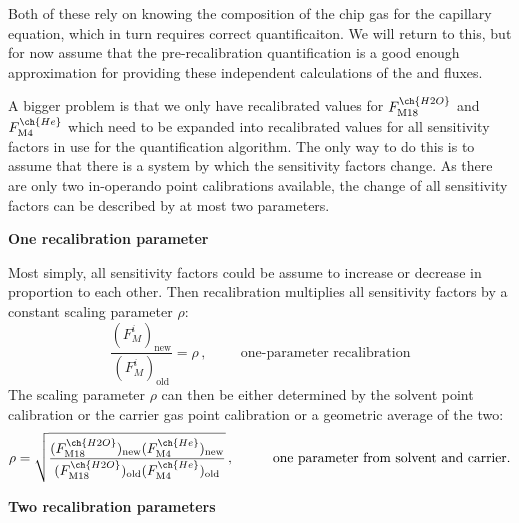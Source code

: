 \documentclass{article}
\begin{document}
Both of these rely on knowing the composition of the chip gas for the capillary equation, which in turn requires correct quantificaiton. We will return to this, but for now assume that the pre-recalibration quantification is a good enough approximation for providing these independent calculations of the  and  fluxes.

A bigger problem is that we only have recalibrated values for $F^{\ch{H2O}}_\text{M18}$ and $F^{\ch{He}}_\text{M4}$ which need to be expanded into recalibrated values for all sensitivity factors in use for the quantification algorithm. The only way to do this is to assume that there is a system by which the sensitivity factors change. As there are only two in-operando point calibrations available, the change of all sensitivity factors can be described by at most two parameters. 

\textbf{One recalibration parameter}

Most simply, all sensitivity factors could be assume to increase or decrease in proportion to each other. Then recalibration multiplies all sensitivity factors by a constant scaling parameter $\rho$:
\begin{equation}
\frac{(F_M^i)_\text{new}}{(F_M^i)_\text{old}} = \rho \,, \hspace{1cm} \text{one-parameter recalibration}
\end{equation}
The scaling parameter $\rho$ can then be either determined by the solvent point calibration or the carrier gas point calibration or a geometric average of the two:
\begin{equation}
\rho = \sqrt{\frac{(F^{\ch{H2O}}_\text{M18})_\text{new}(F^{\ch{He}}_\text{M4})_\text{new}} {(F^{\ch{H2O}}_\text{M18})_\text{old}(F^{\ch{He}}_\text{M4})_\text{old}}} \,, \hspace{1cm} \text{one parameter from solvent and carrier.}
\end{equation}

\textbf{Two recalibration parameters}
\end{document}
